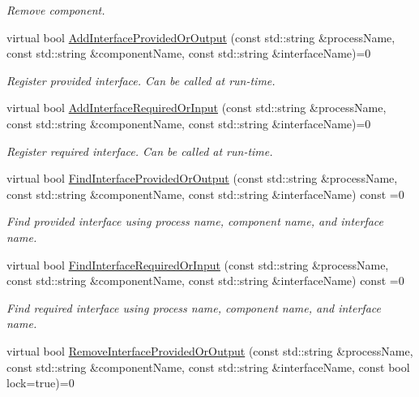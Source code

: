 \begin{DoxyCompactItemize}
\begin{DoxyCompactList}\small\item\em Remove component. \end{DoxyCompactList}\item 
virtual bool \hyperlink{classmts_manager_global_interface_a10365f3c2d04f36170c0551cad2281c5}{Add\-Interface\-Provided\-Or\-Output} (const std\-::string \&process\-Name, const std\-::string \&component\-Name, const std\-::string \&interface\-Name)=0
\begin{DoxyCompactList}\small\item\em Register provided interface. Can be called at run-\/time. \end{DoxyCompactList}\item 
virtual bool \hyperlink{classmts_manager_global_interface_abc65961f2d8d4344a79f40757bbb6e44}{Add\-Interface\-Required\-Or\-Input} (const std\-::string \&process\-Name, const std\-::string \&component\-Name, const std\-::string \&interface\-Name)=0
\begin{DoxyCompactList}\small\item\em Register required interface. Can be called at run-\/time. \end{DoxyCompactList}\item 
virtual bool \hyperlink{classmts_manager_global_interface_aa83816a7945e79c0bc1f52de965d7368}{Find\-Interface\-Provided\-Or\-Output} (const std\-::string \&process\-Name, const std\-::string \&component\-Name, const std\-::string \&interface\-Name) const =0
\begin{DoxyCompactList}\small\item\em Find provided interface using process name, component name, and interface name. \end{DoxyCompactList}\item 
virtual bool \hyperlink{classmts_manager_global_interface_a9d8db8039ba51721068466ec815c92ea}{Find\-Interface\-Required\-Or\-Input} (const std\-::string \&process\-Name, const std\-::string \&component\-Name, const std\-::string \&interface\-Name) const =0
\begin{DoxyCompactList}\small\item\em Find required interface using process name, component name, and interface name. \end{DoxyCompactList}\item 
virtual bool \hyperlink{classmts_manager_global_interface_afe6b343e84ce4a259d3d6e7df4e750a4}{Remove\-Interface\-Provided\-Or\-Output} (const std\-::string \&process\-Name, const std\-::string \&component\-Name, const std\-::string \&interface\-Name, const bool lock=true)=0

\end{DoxyCompactItemize}
